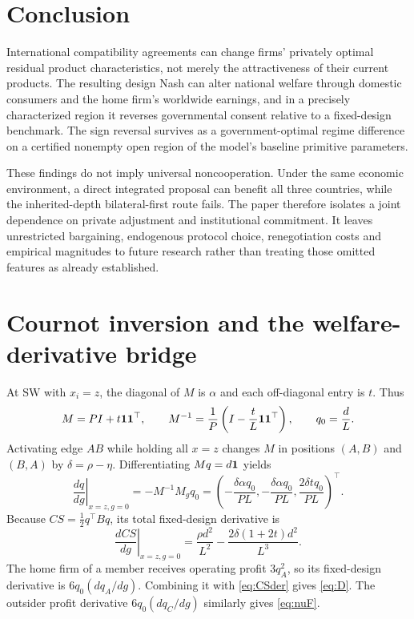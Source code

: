 \documentclass[11pt,a4paper]{article}
\theoremstyle{remark}\newtheorem{remark}[theorem]{Remark}
\newcommand{\SW}{\mathrm{SW}}\newcommand{\SU}{\mathrm{SU}}\newcommand{\IS}{\mathrm{IS}}
\begin{document}
\section{Conclusion}
International compatibility agreements can change firms' privately optimal residual product characteristics, not merely the attractiveness of their current products. The resulting design Nash can alter national welfare through domestic consumers and the home firm's worldwide earnings, and in a precisely characterized region it reverses governmental consent relative to a fixed-design benchmark. The sign reversal survives as a government-optimal regime difference on a certified nonempty open region of the model's baseline primitive parameters.

These findings do not imply universal noncooperation. Under the same economic environment, a direct integrated proposal can benefit all three countries, while the inherited-depth bilateral-first route fails. The paper therefore isolates a joint dependence on private adjustment and institutional commitment. It leaves unrestricted bargaining, endogenous protocol choice, renegotiation costs and empirical magnitudes to future research rather than treating those omitted features as already established.

\appendix
\section{Cournot inversion and the welfare-derivative bridge}\label{app:bridge}
At $\SW$ with $x_i=z$, the diagonal of $M$ is $\alpha$ and each off-diagonal entry is $t$. Thus
\begin{equation}\label{eq:inv}
M=P I+t\boldsymbol{1}\boldsymbol{1}^{\top},\qquad
M^{-1}=\frac1P\left(I-\frac{t}{L}\boldsymbol{1}\boldsymbol{1}^{\top}\right),\qquad q_0=\frac dL.
\end{equation}
Activating edge $AB$ while holding all $x=z$ changes $M$ in positions $(A,B)$ and $(B,A)$ by $\delta=\rho-\eta$. Differentiating $Mq=d\boldsymbol{1}$ yields
\begin{equation}\label{eq:quantityDer}
\left.\frac{dq}{dg}\right|_{x=z,g=0}=-M^{-1}M_gq_0
=\left(-\frac{\delta\alpha q_0}{PL},-\frac{\delta\alpha q_0}{PL},\frac{2\delta t q_0}{PL}\right)^\top.
\end{equation}
Because $CS=\tfrac12q^\top Bq$, its total fixed-design derivative is
\begin{equation}\label{eq:CSder}
\left.\frac{dCS}{dg}\right|_{x=z,g=0}
=\frac{\rho d^2}{L^2}-\frac{2\delta(1+2t)d^2}{L^3}.
\end{equation}
The home firm of a member receives operating profit $3q_A^2$, so its fixed-design derivative is $6q_0(dq_A/dg)$. Combining it with \eqref{eq:CSder} gives \eqref{eq:D}. The outsider profit derivative $6q_0(dq_C/dg)$ similarly gives \eqref{eq:nuF}.
\end{document}
